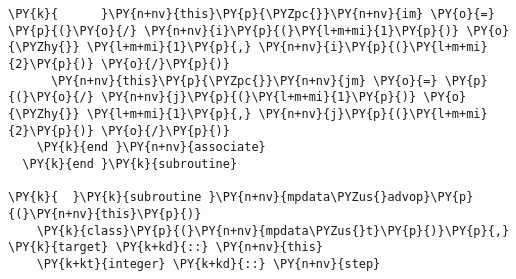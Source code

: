 \begin{Verbatim}[commandchars=\\\{\}]
\PY{k}{      }\PY{n+nv}{this}\PY{p}{\PYZpc{}}\PY{n+nv}{im} \PY{o}{=} \PY{p}{(}\PY{o}{/} \PY{n+nv}{i}\PY{p}{(}\PY{l+m+mi}{1}\PY{p}{)} \PY{o}{\PYZhy{}} \PY{l+m+mi}{1}\PY{p}{,} \PY{n+nv}{i}\PY{p}{(}\PY{l+m+mi}{2}\PY{p}{)} \PY{o}{/}\PY{p}{)}
      \PY{n+nv}{this}\PY{p}{\PYZpc{}}\PY{n+nv}{jm} \PY{o}{=} \PY{p}{(}\PY{o}{/} \PY{n+nv}{j}\PY{p}{(}\PY{l+m+mi}{1}\PY{p}{)} \PY{o}{\PYZhy{}} \PY{l+m+mi}{1}\PY{p}{,} \PY{n+nv}{j}\PY{p}{(}\PY{l+m+mi}{2}\PY{p}{)} \PY{o}{/}\PY{p}{)}
    \PY{k}{end }\PY{n+nv}{associate}
  \PY{k}{end }\PY{k}{subroutine}

\PY{k}{  }\PY{k}{subroutine }\PY{n+nv}{mpdata\PYZus{}advop}\PY{p}{(}\PY{n+nv}{this}\PY{p}{)}
    \PY{k}{class}\PY{p}{(}\PY{n+nv}{mpdata\PYZus{}t}\PY{p}{)}\PY{p}{,} \PY{k}{target} \PY{k+kd}{::} \PY{n+nv}{this}
    \PY{k+kt}{integer} \PY{k+kd}{::} \PY{n+nv}{step}


\end{Verbatim}
